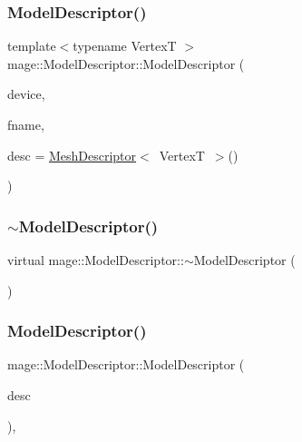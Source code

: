 \subsubsection{\texorpdfstring{Model\+Descriptor()}{ModelDescriptor()}\hspace{0.1cm}{\footnotesize\ttfamily [1/3]}}
{\footnotesize\ttfamily template$<$typename VertexT $>$ \\
mage\+::\+Model\+Descriptor\+::\+Model\+Descriptor (\begin{DoxyParamCaption}\item[{I\+D3\+D11\+Device2 \&}]{device,  }\item[{const wstring \&}]{fname,  }\item[{const \hyperlink{structmage_1_1_mesh_descriptor}{Mesh\+Descriptor}$<$ VertexT $>$ \&}]{desc = {\ttfamily \hyperlink{structmage_1_1_mesh_descriptor}{Mesh\+Descriptor}$<$~VertexT~$>$()} }\end{DoxyParamCaption})}

\hypertarget{classmage_1_1_model_descriptor_a3bc8ee3d1cb8d2675374727edce3d593}{}\label{classmage_1_1_model_descriptor_a3bc8ee3d1cb8d2675374727edce3d593} 
\subsubsection{\texorpdfstring{$\sim$\+Model\+Descriptor()}{~ModelDescriptor()}}
{\footnotesize\ttfamily virtual mage\+::\+Model\+Descriptor\+::$\sim$\+Model\+Descriptor (\begin{DoxyParamCaption}{ }\end{DoxyParamCaption})\hspace{0.3cm}{\ttfamily [virtual]}}

\hypertarget{classmage_1_1_model_descriptor_af44185efc20e10ede762d29bc454c5f3}{}\label{classmage_1_1_model_descriptor_af44185efc20e10ede762d29bc454c5f3} 
\subsubsection{\texorpdfstring{Model\+Descriptor()}{ModelDescriptor()}\hspace{0.1cm}{\footnotesize\ttfamily [2/3]}}
{\footnotesize\ttfamily mage\+::\+Model\+Descriptor\+::\+Model\+Descriptor (\begin{DoxyParamCaption}\item[{const \hyperlink{classmage_1_1_model_descriptor}{Model\+Descriptor} \&}]{desc }\end{DoxyParamCaption})\hspace{0.3cm}{\ttfamily [private]}, {\ttfamily [delete]}}

